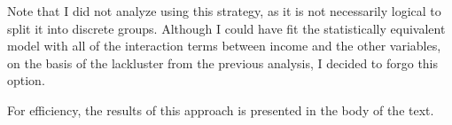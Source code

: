 \documentclass[11pt]{article}
\begin{document}
Note that I did not analyze using this strategy, as it is not necessarily logical to split it into discrete groups. Although I could have fit the statistically equivalent model with all of the interaction terms between income and the other variables, on the basis of the lackluster from the previous analysis, I decided to forgo this option.

For efficiency, the results of this approach is presented in the body of the text.
\end{document}
